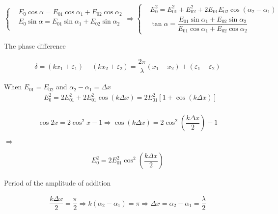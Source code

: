 \begin{equation*}
  \left\{
    \begin{aligned}
      & E_0 \cos \alpha = E_{01} \cos \alpha_1 + E_{02} \cos \alpha_2 \\
      & E_0 \sin \alpha = E_{01} \sin \alpha_1 + E_{02} \sin \alpha_2 \\
    \end{aligned}
  \right.
  \Rightarrow
  \left\{
    \begin{aligned}
      & E_0^2 = E_{01}^2 + E_{02}^2 + 2 E_{01} E_{02} \cos \left( \alpha_2 - \alpha_1 \right) \\
      & \tan \alpha = \dfrac{E_{01} \sin \alpha_1 + E_{02} \sin \alpha_2}{E_{01} \cos \alpha_1 + E_{02} \cos \alpha_2} 
    \end{aligned}
  \right.
\end{equation*}

The phase difference

\begin{equation*}
  \begin{aligned}
    \delta = \left( k x_1 + \varepsilon_1 \right) - \left( k x_2 + \varepsilon_2 \right) = \dfrac{2 \pi}{\lambda} \left( x_1 - x_2 \right) + \left( \varepsilon_1 - \varepsilon_2 \right)
  \end{aligned}
\end{equation*}

When $E_{01} = E_{02}$ and $\alpha_2 - \alpha_1 = \Delta x$
\begin{equation*}
  \begin{aligned}
      & E_0^2 = 2 E_{01}^2 + 2 E_{01}^2 \cos \left( k \Delta x \right) = 2 E_{01}^2 \left[ 1 + \cos \left( k \Delta x \right) \right] \\
  \end{aligned}
\end{equation*}

\begin{equation*}
  \begin{aligned}
    \cos 2x = 2 \cos^2 x - 1 \Rightarrow \cos \left( k \Delta x \right) = 2 \cos^2 \left( \dfrac{k \Delta x}{2}  \right) - 1
  \end{aligned}
\end{equation*}

$\Rightarrow$

\begin{equation*}
  \begin{aligned}
    E_0^2 = 2 E_{01}^2 \cos^2 \left( \dfrac{k \Delta x}{2}  \right)
  \end{aligned}
\end{equation*}

Period of the amplitude of addition

\begin{equation*}
  \begin{aligned}
    \dfrac{k \Delta x}{2} = \dfrac{\pi}{2}  \Rightarrow k \left( \alpha_2 - \alpha_1 \right) = \pi \Rightarrow \Delta x = \alpha_2 - \alpha_1 = \dfrac{\lambda}{2} 
  \end{aligned}
\end{equation*}



